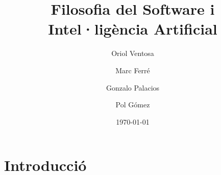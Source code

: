 \documentclass[a4paper,12pt]{report}
\begin{document}
\title{
	{\bf Filosofia del Software i Intel·ligència Artificial} \\ \vspace{2 mm}
}
\author{
	Oriol Ventosa \and
	Marc Ferré \and
	Gonzalo Palacios \and
	Pol Gómez
}
\date{\today}
\maketitle

\tableofcontents

\chapter{Introducció}

\end{document}
